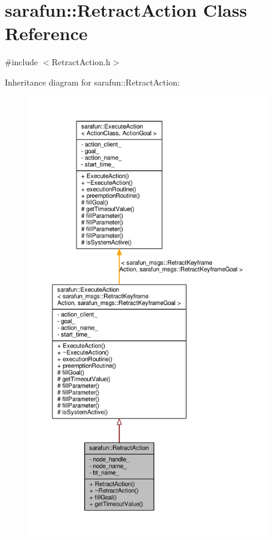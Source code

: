 \hypertarget{classsarafun_1_1RetractAction}{\section{sarafun\-:\-:Retract\-Action Class Reference}
\label{classsarafun_1_1RetractAction}
}


{\ttfamily \#include $<$Retract\-Action.\-h$>$}



Inheritance diagram for sarafun\-:\-:Retract\-Action\-:
\nopagebreak
\begin{figure}[H]
\begin{center}
\leavevmode
\includegraphics[height=550pt]{d6/d3a/classsarafun_1_1RetractAction__inherit__graph}
\end{center}
\end{figure}


